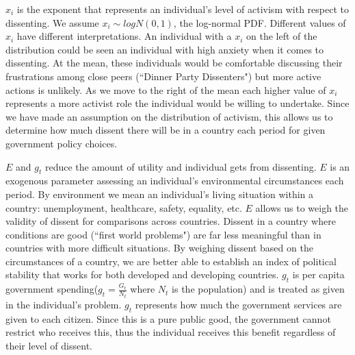 \documentclass[12pt]{article}
\begin{document}
\begin{spacing}{1.5}
$x_i$ is the exponent that represents an individual's level of activism with respect to dissenting. We assume $x_i \sim logN(0,1)$, the log-normal PDF. Different values of $x_i$ have different interpretations. An individual with a $x_i$ on the left of the distribution could be seen an individual with high anxiety when it comes to dissenting. At the mean, these individuals would be comfortable discussing their frustrations among close peers (``Dinner Party Dissenters") but more active actions is unlikely. As we move to the right of the mean each higher value of $x_i$ represents a more activist role the individual would be willing to undertake. Since we have made an assumption on the distribution of activism, this allows us to determine how much dissent there will be in a country each period for given government policy choices.    

$E$ and $g_t$ reduce the amount of utility and individual gets from dissenting. $E$ is an exogenous parameter assessing an individual's environmental circumstances each period. By environment we mean an individual's living situation within a country: unemployment, healthcare, safety, equality, etc. $E$ allows us to weigh the validity of dissent for comparisons across countries. Dissent in a country where conditions are good (``first world problems")  are far less meaningful than in countries with more difficult situations. By weighing dissent based on the circumstances of a country, we are better able to establish an index of political stability that works for both developed and developing countries. $g_t$ is per capita government spending($g_t=\frac{G_t}{N_t}$ where $N_t$ is the population) and is treated as given in the individual's problem. $g_t$ represents how much the government services are given to each citizen. Since this is a pure public good, the government cannot restrict who receives this, thus the individual receives this benefit regardless of their level of dissent. 





\end{spacing}
\end{document}
